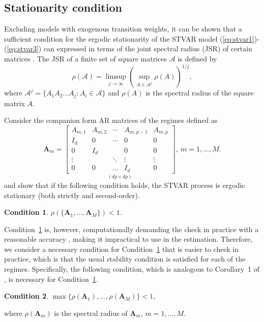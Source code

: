 \documentclass[nojss]{jss}
\newtheorem{condition}{Condition}
\begin{document}
\subsection{Stationarity condition}\label{sec:stationarity}

Excluding models with exogenous transition weights, it can be shown that a sufficient condition for the ergodic stationarity of the STVAR model (\ref{eq:stvar1})-(\ref{eq:stvar3}) can expressed in terms of the joint spectral radius (JSR) of certain matrices \citep{Kheifets+Saikkonen:2020}. The JSR of a finite set of square matrices $\mathcal{A}$ is defined by
\begin{equation}
\rho(\mathcal{A}) = \underset{j\rightarrow \infty}{\limsup}\left(\underset{A\in \mathcal{A}^j}{\sup}\rho(A) \right)^{1/j},
\end{equation}
where $\mathcal{A}^j=\lbrace A_1A_2...A_j:A_i\in\mathcal{A}\rbrace$ and $\rho(A)$ is the spectral radius of the square matrix $A$.

Consider the companion form AR matrices of the regimes defined as
\begin{equation}\label{eq:boldA}
\boldsymbol{A}_m =
\underset{(dp\times dp)}{\begin{bmatrix}
A_{m,1} & A_{m,2} & \cdots & A_{m,p-1} & A_{m,p} \\
I_d  & 0     & \cdots & 0            & 0 \\
0     & I_d  &             & 0            & 0 \\
\vdots &   & \ddots & \vdots    & \vdots \\
0     & 0     & \hdots & I_d         & 0
\end{bmatrix}}, \
m=1,...,M.
\end{equation}
\citet[][Theorem 1]{Kheifets+Saikkonen:2020} and \cite{Lanne+Virolainen:2024} \citep[see also][]{Saikkonen:2008} show that if the following condition holds, the STVAR process is ergodic stationary (both strictly and second-order).
\begin{condition}\label{cond:sufficient}
$\rho(\lbrace \boldsymbol{A}_1,...,\boldsymbol{A}_M \rbrace) < 1$.
\end{condition}

Condition~\ref{cond:sufficient} is, however, computationally demanding the check in practice with a reasonable accuracy \citep[e.g.,][]{Chang+Blondel:2013}, making it impractical to use in the estimation. Therefore, we consider a necessary condition for Condition~\ref{cond:sufficient} that is easier to check in practice, which is that the usual stability condition is satisfied for each of the regimes. Specifically, the following condition, which is analogous to Corollary~1 of \cite{Kheifets+Saikkonen:2020}, is necessary for Condition~\ref{cond:sufficient}.
\begin{condition}\label{cond:necessary}
$\max\lbrace \rho(\boldsymbol{A}_1),...,\rho(\boldsymbol{A}_M)\rbrace<1$,
\end{condition}
where $\rho(\boldsymbol{A}_m)$ is the spectral radius of $\boldsymbol{A}_m$, $m=1,...,M$.
\end{document}

